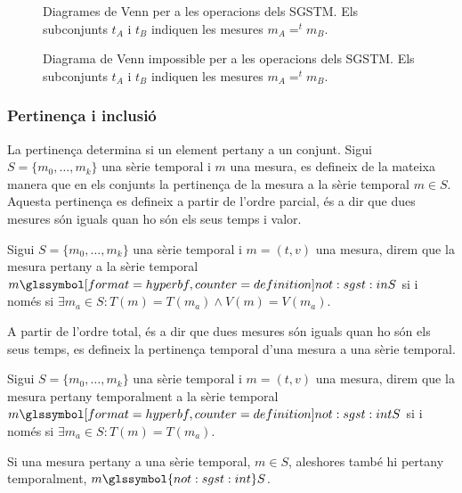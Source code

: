\begin{figure}[tp]
  \centering
  
  \caption{Diagrames de Venn per a les operacions dels \gls{SGSTM}. Els
    subconjunts $t_A$ i $t_B$ indiquen les mesures $m_A =^t m_B$.}
  \label{fig:model:sgst:venn}
\end{figure}


\begin{figure}[tp]
  \centering
  
  \caption{Diagrama de Venn impossible per a les operacions dels
    \gls{SGSTM}. Els subconjunts $t_A$ i $t_B$ indiquen les mesures
    $m_A =^t m_B$.}
  \label{fig:model:sgst:venn-impossible}
\end{figure}


\subsubsection{Pertinença i inclusió}


La pertinença determina si un element pertany a un conjunt.  Sigui
$S=\{m_0,\ldots,m_k\}$ una sèrie temporal i $m$ una mesura, es
defineix de la mateixa manera que en els conjunts la pertinença de la
mesura a la sèrie temporal $m \in S$. Aquesta pertinença es defineix a
partir de l'ordre parcial, és a dir que dues mesures són iguals quan
ho són els seus temps i valor.
\begin{definition}[Pertinença]
  Sigui $S=\{m_0,\ldots,m_k\}$ una sèrie temporal i $m=(t,v)$ una
  mesura, direm que la mesura pertany a la sèrie temporal
  $m \glssymboldef{not:sgst:in} S$ si i només si $\exists m_a \in S :
  T(m) = T(m_a) \wedge V(m) = V(m_a)$.
\end{definition}




A partir de l'ordre total, és a dir que dues mesures són iguals quan
ho són els seus temps, es defineix la pertinença temporal d'una mesura
a una sèrie temporal.
\begin{definition}
  Sigui $S=\{m_0,\ldots,m_k\}$ una sèrie temporal i $m=(t,v)$ una
  mesura, direm que la mesura pertany temporalment a la sèrie temporal
  $m \glssymboldef{not:sgst:int} S$ si i només si $\exists m_a \in S :
  T(m) = T(m_a)$.
\end{definition}


Si una mesura pertany a una sèrie temporal, $m\in S$, aleshores també
hi pertany temporalment, $m \glssymbol{not:sgst:int} S$.



